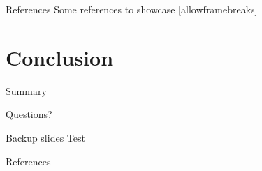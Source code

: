 \documentclass[10pt]{beamer}
\begin{document}
\begin{frame}{References}
  Some references to showcase [allowframebreaks] \cite{knuth92,ConcreteMath,Simpson,Er01,greenwade93}
\end{frame}
\section{Conclusion}

\begin{frame}{Summary}

\end{frame}

{
\begin{frame}[standout]
  Questions?
\end{frame}
}

\appendix
\begin{frame}[fragile]{Backup slides}
Test
\end{frame}

\begin{frame}[allowframebreaks]{References}

  
  

\end{frame}
\end{document}
